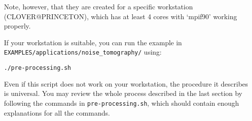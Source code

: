Note, however, that they are created for a specific workstation (CLOVER@PRINCETON),
which has at least 4 cores with `mpif90' working properly. \newline


If your workstation is suitable, you can run the example in \texttt{EXAMPLES/applications/noise\_tomography/}
using:\newline

\texttt{./pre-processing.sh}\newline


Even if this script does not work on your workstation, the procedure
it describes is universal. You may review the whole process described
in the last section by following the commands in \texttt{pre-processing.sh},
which should contain enough explanations for all the commands.


